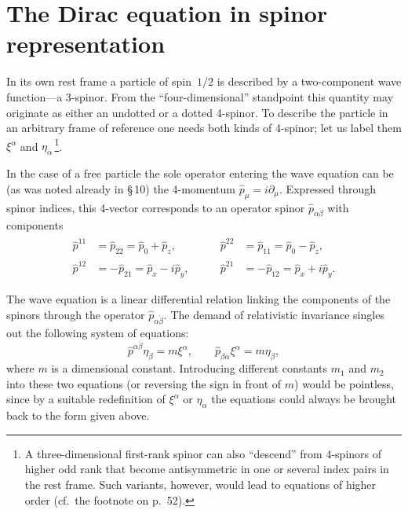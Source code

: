 \section{The Dirac equation in spinor representation}

In its own rest frame a particle of spin~$1/2$ is described by a two-component wave function---a 3-spinor. From the ``four-dimensional'' standpoint this quantity may originate as either an undotted or a dotted 4-spinor. To describe the particle in an arbitrary frame of reference one needs both kinds of 4-spinor; let us label them $\xi^\alpha$ and $\eta_{\dot\alpha}$\,\footnote{A three-dimensional first-rank spinor can also ``descend'' from 4-spinors of higher odd rank that become antisymmetric in one or several index pairs in the rest frame. Such variants, however, would lead to equations of higher order (cf.\ the footnote on p.~52).}.

In the case of a free particle the sole operator entering the wave equation can be (as was noted already in \S\,10) the 4-momentum $\widehat p_\mu = i\partial_\mu$. Expressed through spinor indices, this 4-vector corresponds to an operator spinor $\widehat p_{\alpha\dot\beta}$ with components
\begin{equation}
\begin{aligned}
\widehat p^{1\dot 1} &= \widehat p_{2\dot 2} = \widehat p_0 + \widehat p_z, &\qquad \widehat p^{2\dot 2} &= \widehat p_{1\dot 1} = \widehat p_0 - \widehat p_z,\\
\widehat p^{1\dot 2} &= -\widehat p_{2\dot 1} = \widehat p_x - i\widehat p_y, &\qquad \widehat p^{2\dot 1} &= -\widehat p_{1\dot 2} = \widehat p_x + i\widehat p_y.
\end{aligned}
\tag{20.1}
\end{equation}

The wave equation is a linear differential relation linking the components of the spinors through the operator $\widehat p_{\alpha\dot\beta}$. The demand of relativistic invariance singles out the following system of equations:
\begin{equation}
\widehat p^{\alpha\dot\beta}\eta_{\dot\beta} = m\xi^\alpha,\qquad \widehat p_{\dot\beta\alpha}\xi^\alpha = m\eta_{\dot\beta},
\tag{20.2}
\end{equation}
where $m$ is a dimensional constant. Introducing different constants $m_1$ and $m_2$ into these two equations (or reversing the sign in front of $m$) would be pointless, since by a suitable redefinition of $\xi^\alpha$ or $\eta_{\dot\alpha}$ the equations could always be brought back to the form given above.

